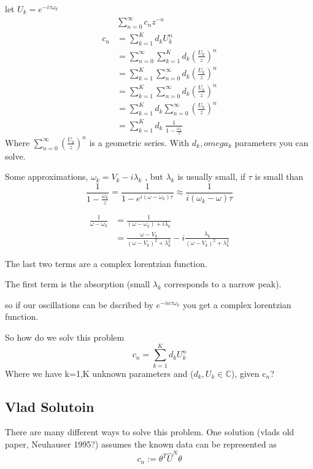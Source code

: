 \documentclass{article}
\newcommand{\be}{\begin{equation}}
\newcommand{\ee}{\end{equation}}
\begin{document}
let $U_k = e^{-i\tau\omega_k}$
\be
\begin{split}
    &\sum_{n=0}^\infty c_nz^{-n}\\
    c_n &= \sum_{k=1}^K d_k U_k^n\\
    &= \sum_{n=0}^\infty \sum_{k=1}^K d_k\left(\frac{U_k}{z}\right)^n\\
    &= \sum_{k=1}^K \sum_{n=0}^\infty d_k\left(\frac{U_k}{z}\right)^n\\
    &= \sum_{k=1}^K \sum_{n=0}^\infty d_k\left(\frac{U_k}{z}\right)^n\\
    &= \sum_{k=1}^K d_k \sum_{n=0}^\infty \left(\frac{U_k}{z}\right)^n\\
    &= \sum_{k=1}^K d_k \; \frac{1}{1 - \frac{\omega_k}{z}}
\end{split}
\ee
Where $\sum_{n=0}^\infty \left(\frac{U_k}{z}\right)^n$ is a geometric series. 
With $d_k,omega_k$ parameters you can solve. 

Some approximations, $\omega_k = V_k - i\lambda_k$ , but $\lambda_k$ is usually small, if $\tau$ is small than
\be
\frac{1}{1-\frac{\omega_k}{z}} = \frac{1}{1-e^{i(\omega-\omega_k)\tau}} \approx \frac{1}{i(\omega_k-\omega)\tau}
\ee

\be
\begin{split}
    \frac{1}{\omega-\omega_k} &= \frac{1}{(\omega-\omega_k)+i\lambda_k} \\
    &= \frac{\omega-V_k}{(\omega-V_k)^2 + \lambda_k^2} - i \frac{\lambda_k}{(\omega-V_k)^2+\lambda_k^2}
\end{split}
\ee

The last two terms are a complex lorentzian function. 

The first term is the absorption (small $\lambda_k$ corresponds to a narrow peak). 

so if our oscillations can be dscribed by $e^{-in\tau\omega_k}$ you get a complex lorentzian function. 

So how do we solv this problem
\be
c_n = \sum_{k=1}^K d_kU_k^n
\ee
Where we have k=1,K unknown parameters and ($d_k,U_k \in \mathbb{C}$), given c$_n$?

\subsection{Vlad Solutoin}
There are many different ways to solve this problem. 
One solution (vlads old paper, Neuhauser 1995?) assumes the known data can be represented as
\be
c_n := \theta^T\widehat{U}^N\theta
\ee
\end{document}
